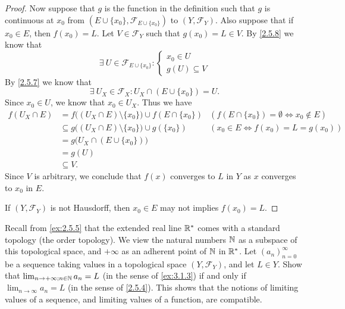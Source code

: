 \begin{proof}
  Now suppose that \(g\) is the function in the definition such that \(g\) is continuous at \(x_0\) from \((E \cup \{x_0\}, \mathcal{F}_{E \cup \{x_0\}})\) to \((Y, \mathcal{F}_Y)\).
  Also suppose that if \(x_0 \in E\), then \(f(x_0) = L\).
  Let \(V \in \mathcal{F}_Y\) such that \(g(x_0) = L \in V\).
  By \cref{2.5.8} we know that
  \[
    \exists\ U \in \mathcal{F}_{E \cup \{x_0\}} : \begin{cases}
      x_0 \in U \\
      g(U) \subseteq V
    \end{cases}
  \]
  By \cref{2.5.7} we know that
  \[
    \exists\ U_X \in \mathcal{F}_X : U_X \cap (E \cup \{x_0\}) = U.
  \]
  Since \(x_0 \in U\), we know that \(x_0 \in U_X\).
  Thus we have
  \begin{align*}
    f(U_X \cap E) & = f\big((U_X \cap E) \setminus \{x_0\}\big) \cup f(E \cap \{x_0\})  & (f(E \cap \{x_0\}) = \emptyset \iff x_0 \notin E) \\
                  & \subseteq g\big((U_X \cap E) \setminus \{x_0\}\big) \cup g(\{x_0\}) & (x_0 \in E \iff f(x_0) = L = g(x_0))              \\
                  & = g\big(U_X \cap (E \cup \{x_0\})\big)                                                                                  \\
                  & = g(U)                                                                                                                  \\
                  & \subseteq V.
  \end{align*}
  Since \(V\) is arbitrary, we conclude that \(f(x)\) converges to \(L\) in \(Y\) as \(x\) converges to \(x_0\) in \(E\).

  If \((Y, \mathcal{F}_Y)\) is not Hausdorff, then \(x_0 \in E\) may not implies \(f(x_0) = L\).
\end{proof}

\begin{ex}\label{ex:3.1.4}
  Recall from \cref{ex:2.5.5} that the extended real line \(\mathbb{R}^*\) comes with a standard topology (the order topology).
  We view the natural numbers \(\mathbb{N}\) as a subspace of this topological space, and \(+\infty\) as an adherent point of \(\mathbb{N}\) in \(\mathbb{R}^*\).
  Let \((a_n)_{n = 0}^\infty\) be a sequence taking values in a topological space \((Y, \mathcal{F}_Y)\), and let \(L \in Y\).
  Show that \(\lim_{n \to +\infty ; n \in \mathbb{N}} a_n = L\) (in the sense of \cref{ex:3.1.3}) if and only if \(\lim_{n \to \infty} a_n = L\) (in the sense of \cref{2.5.4}).
  This shows that the notions of limiting values of a sequence, and limiting values of a function, are compatible.
\end{ex}

